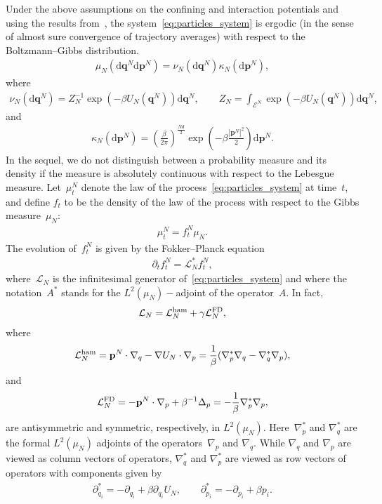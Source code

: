\documentclass[onefignum,onetabnum]{siamart251216} %
\renewcommand{\d}{\mathrm{d}}
\newcommand{\mc}[1]{\mathcal{#1}}
\newcommand{\mescin}{\mu}
\newcommand{\mespos}{\nu}
\newcommand{\mesvit}{\kappa}
\newcommand{\LhamN}{\mc{L}^{\rm{ham}}_N}
\newcommand{\LFDN}{\mc{L}^{\rm{FD}}_N}
\newcommand{\vP}[1]{\mathbf{p}^{#1}}
\newcommand{\vQ}[1]{\mathbf{q}^{#1}}
\theoremstyle{plain}
\numberwithin{equation}{section}
\numberwithin{theorem}{section}
\begin{document}
Under the above assumptions on the confining and interaction potentials and using the results from~\cite{mattingly2002geometric,kliemann1987recurrence}, the system~\eqref{eq:particles_system} is ergodic  (in the sense of almost sure convergence of trajectory averages) with respect to the Boltzmann--Gibbs distribution.
\begin{align}
    \label{eq:mes_equilibre}
    \mu_N(\d\vQ{N} \d\vP{N}) = \mespos_N(\d\vQ{N}) \mesvit_N(\d\vP{N}),
\end{align}
where
\begin{align}
    \label{eq:mes_posN}
    \mespos_N(\d\vQ{N}) = Z_N^{-1}\exp\!\left(-\beta U_N(\vQ{N})\right)\d\vQ{N}, \qquad Z_N = \int_{\mc{E}^N}\exp\!\left(-\beta U_N(\vQ{N})\right)\d\vQ{N},
\end{align}
and
\begin{align}
    \label{eq:mes_vitN}
    \mesvit_N(\d\vP{N}) = \left(\frac{\beta}{2\pi}\right)^{\frac{Nd}{2}}\exp\!\left(-\beta \frac{|\vP{N}|^2}{2}\right)\d\vP{N}.
\end{align}
In the sequel, we do not distinguish between a probability measure and its density
if the measure is absolutely continuous with respect to the Lebesgue measure.
Let~$\mescin_t^N$ denote the law of the process~\eqref{eq:particles_system} at time~$t$, and define $f_t$ to be the density of the law of the process with respect to the Gibbs measure~$\mescin_N$:
\begin{align}\label{e:density}
    \mescin_t^N = f_t^N \mescin_N.
\end{align}
The evolution of~$f_t^N$ is given by the Fokker--Planck equation
\begin{align}
    \label{eq:kinetic_fp}
    \partial_t f_t^N = \mc{L}^*_N f_t^N,
\end{align}
where~$\mc{L}_N$ is the infinitesimal generator of~\eqref{eq:particles_system} and where the notation~$A^*$ stands for the $L^2(\mu_N)-$adjoint of the operator~$A$.
In fact,
\begin{align}
    \label{eq:generator_mf}
    \mc{L}_N =  \LhamN + \gamma\LFDN,
\end{align}
where
\begin{align}
    \label{eq:LhamN}
    \LhamN = \vP{N} \cdot \nabla_q - \nabla U_N \cdot \nabla_p = \frac1\beta(\nabla_p^*\nabla_q - \nabla_q^*\nabla_p),
\end{align}
and
\begin{align}
    \label{eq:LSymN}
    \LFDN = -\vP{N}\cdot\nabla_p + \beta^{-1}\Delta_p = -\frac1\beta\nabla_p^*\nabla_p,
\end{align}
 are antisymmetric and symmetric, respectively, in $L^2(\mu_N)$.
 Here~$\nabla_p^*$ and $\nabla_q^*$ are the formal $L^2(\mu_N)$ adjoints of the operators~$\nabla_p$ and $\nabla_q$.
 While $\nabla_q$ and $\nabla_p$ are viewed as column vectors of operators,
$\nabla_q^*$ and $\nabla_p^*$ are viewed as row vectors of operators with components given by
\begin{align*}
    \partial_{q_i}^*  = -\partial_{q_i} + \beta \partial_{q_i} U_N , \qquad \partial_{p_i}^*  = -\partial_{p_i} + \beta p_i .
\end{align*}
%
%
\end{document}
